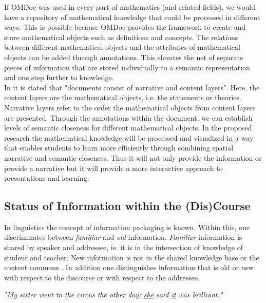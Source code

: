\documentclass[twoside]{article}
\begin{document}
If OMDoc was used in every part of mathematics (and related fields), we would have a repository of mathematical knowledge that could be processed in different ways. This is possible because OMDoc provides the framework to create and store mathematical objects such as definitions and concepts. The relations between different mathematical objects and the attributes of mathematical objects can be added through annotations. This elevates the net of separate pieces of information that are stored individually to a semantic representation and one step further to knowledge.\\

In \cite{LK:MathOntoAuthDoc09} it is stated that "documents consist of narrative and content layers". Here, the content layers are the mathematical objects, i.e. the statements or theories. Narrative layers refer to the order the mathematical objects from content layers are presented. Through the annotations within the document, we can establish levels of semantic closeness for different mathematical objects. In the proposed research the mathematical knowledge will be processed and visualized in a way that enables students to learn more efficiently through combining spatial narrative and semantic closeness. Thus it will not only provide the information or provide a narrative but it will provide a more interactive approach to presentations and learning.\\

\subsection{Status of Information within the (Dis)Course}
\label{sec:infostatus}

In linguistics the concept of information packaging \cite{CambridgeGrammar:npentrel14} is known. Within this, one discriminates between \textit{familiar} and \textit{old} information. \textit{Familiar} information is shared by speaker and addressee, ie. it is in the intersection of knowledge of student and teacher. New information is not in the shared knowledge base or the content commons \cite{CNX:whitepaper}. In addition one distinguishes information that is old or new with respect to the discourse or with respect to the addressee.

\begin{center}
\textit{"My sister went to the circus the other day; \underline{she} said \underline{it} was brilliant."}\\
\end{center}
\end{document}
